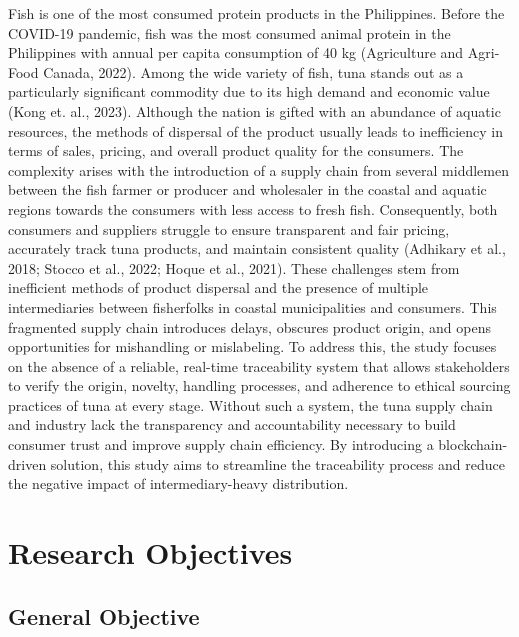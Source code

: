 Fish is one of the most consumed protein products in the Philippines. Before the COVID-19 pandemic, fish was the most consumed animal protein in the Philippines with annual per capita consumption of 40 kg (Agriculture and Agri-Food Canada, 2022)\nocite{rrl-SoTIP4}. Among the wide variety of fish, tuna stands out as a particularly significant commodity due to its high demand and economic value (Kong et. al., 2023)\nocite{intro-4}. Although the nation is gifted with an abundance of aquatic resources, the methods of dispersal of the product usually leads to inefficiency in terms of sales, pricing, and overall product quality for the consumers. The complexity arises with the introduction of a supply chain from several middlemen between the fish farmer or producer and wholesaler in the coastal and aquatic regions towards the consumers with less access to fresh fish. Consequently, both consumers and suppliers struggle to ensure transparent and fair pricing, accurately track tuna products, and maintain consistent quality (Adhikary et al., 2018; Stocco et al., 2022; Hoque et al., 2021)\nocite{intro-5}\nocite{intro-6}\nocite{intro-7}. These challenges stem from inefficient methods of product dispersal and the presence of multiple intermediaries between fisherfolks in coastal municipalities and consumers. This fragmented supply chain introduces delays, obscures product origin, and opens opportunities for mishandling or mislabeling. To address this, the study focuses on the absence of a reliable, real-time traceability system that allows stakeholders to verify the origin, novelty, handling processes, and adherence to ethical sourcing practices of tuna at every stage. Without such a system, the tuna supply chain and industry lack the transparency and accountability necessary to build consumer trust and improve supply chain efficiency. By introducing a blockchain-driven solution, this study aims to streamline the traceability process and reduce the negative impact of intermediary-heavy distribution.



\section{Research Objectives}
\label{sec:researchobjectives}

\subsection{General Objective}
\label{sec:generalobjective}

